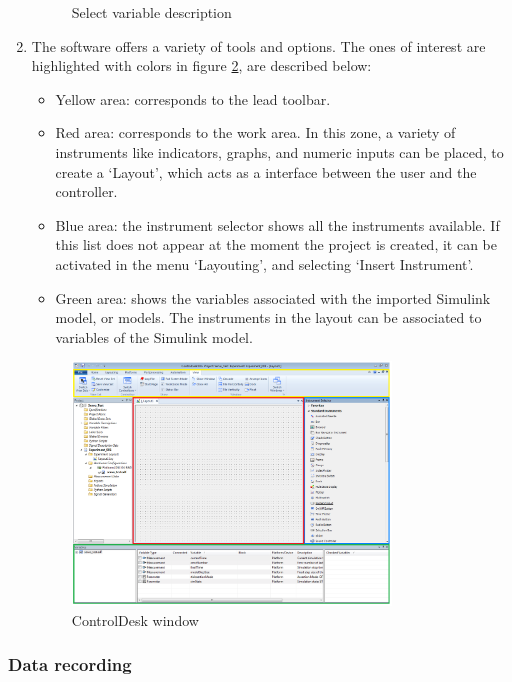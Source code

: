 \begin{enumerate}
\begin{figure}[H]
        \caption{Select variable description}
        \label{fig28}
    \end{figure}
    \item The software offers a variety of tools and options. The ones of interest are highlighted with colors in figure \ref{fig29}, are described below:
    \begin{itemize}
        \item Yellow area: corresponds to the lead toolbar.
        \item Red area: corresponds to the work area. In this zone, a variety of instruments like indicators, graphs, and numeric inputs can be placed, to create a ‘Layout’, which acts as a interface between the user and the controller.
        \item Blue area: the instrument selector shows all the instruments available. If this list does not appear at the moment the project is created, it can be activated in the menu ‘Layouting’, and selecting ‘Insert Instrument’.
        \item Green area: shows the variables associated with the imported Simulink model, or models. The instruments in the layout can be associated to variables of the Simulink model.
    \end{itemize}
    \begin{figure}[H]
        \centering
        \includegraphics[width=0.8\textwidth]{Images/Ball and Bean/ControlDesk/CD6.png}
        \caption{ControlDesk window}
        \label{fig29}
    \end{figure}
    
\end{enumerate}


\subsubsection{Data recording}

